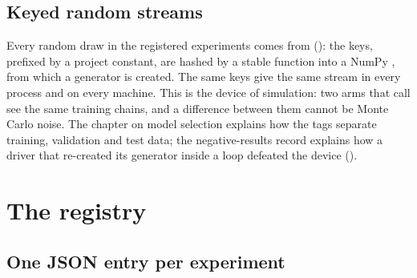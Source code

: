\subsection{Keyed random streams}
\label{sec:streams}

\begingroup\sloppy
Every random draw in the registered experiments comes from
 (): the keys, prefixed by a
project constant, are hashed by a stable function into a NumPy , from
which a generator is created. The same keys give the same stream in every process and on
every machine. This is the  device of simulation: two arms
that call  see the same training chains, and a
difference between them cannot be Monte Carlo noise. The chapter on model selection
explains how the tags separate training, validation and test data; the negative-results
record explains how a driver that re-created its generator inside a loop defeated the
device ().\par\endgroup

\section{The registry}
\label{sec:registry}

\subsection{One JSON entry per experiment}

